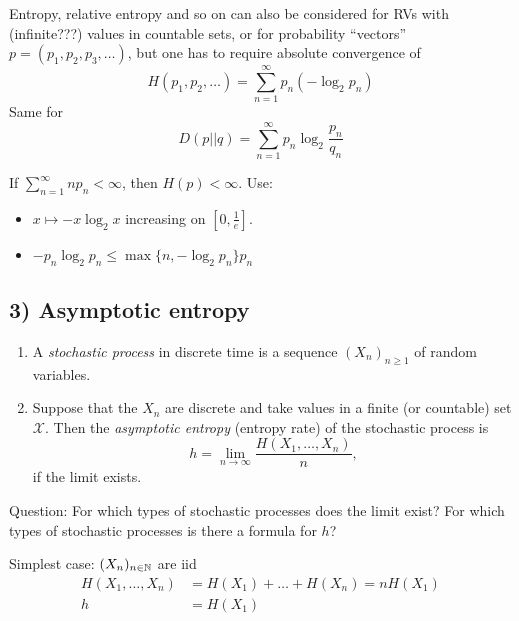 \documentclass[mfit.tex]{subfiles}
\begin{document}

\begin{rem}
  Entropy, relative entropy and so on can also be considered for RVs with (infinite???) values in countable sets, or for probability \enquote{vectors} $p = (p_1,p_2,p_3,\dots)$, but one has to require absolute convergence of
  \[ H(p_1,p_2,\dots) = \sum_{n=1}^\infty p_n (-\log_2 p_n) \]
  Same for 
  \[ D(p||q) = \sum_{n=1}^\infty p_n \log_2 \frac{p_n}{q_n} \]
\end{rem}

\begin{ex}
  If $\sum_{n=1}^\infty n p_n < \infty$, then $H(p) < \infty$.
  Use:
  \begin{itemize}
    \item $x \mapsto -x \log_2 x$  increasing on $[0,\frac{1}{e}]$.
    \item $-p_n \log_2 p_n \leq \max \{n, -\log_2 p_n\} p_n$
  \end{itemize}
\end{ex}


\subsection{3) Asymptotic entropy}

\begin{defi*}
  \begin{enumerate}[label=(\alph*)]
    \item A \emph{stochastic process} in discrete time is a sequence $(X_n)_{n \geq 1}$ of random variables.
    \item Suppose that the $X_n$ are discrete and take values in a finite (or countable) set $\mathcal{X}$.
    Then the \emph{asymptotic entropy} (entropy rate) of the stochastic process is 
    \[ h = \lim_{n \to \infty} \frac{H(X_1,\dots,X_n)}{n} \text{,} \]
    if the limit exists.
  \end{enumerate}
\end{defi*}

Question: For which types of stochastic processes does the limit exist? For which types of stochastic processes is there a formula for $h$?

Simplest case: $(X_n)_{n \in \mathbb{N}}$ are iid
\begin{align*}
  H(X_1,\dots,X_n) &= H(X_1) + \dots + H(X_n) = n H(X_1) \\
  h &= H(X_1)
\end{align*}
\end{document}
